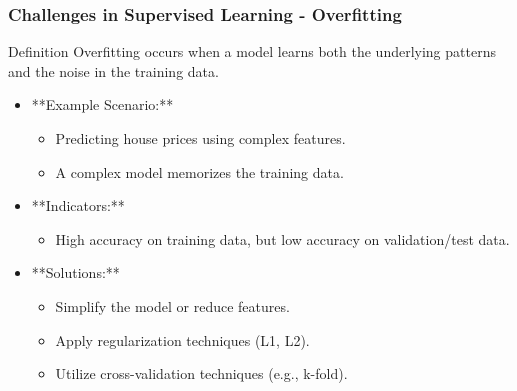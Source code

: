 \documentclass[aspectratio=169]{beamer}
\begin{document}
\begin{frame}[fragile]
    \frametitle{Challenges in Supervised Learning - Overfitting}
    \begin{block}{Definition}
        Overfitting occurs when a model learns both the underlying patterns and the noise in the training data.
    \end{block}
    \begin{itemize}
        \item **Example Scenario:** 
            \begin{itemize}
                \item Predicting house prices using complex features.
                \item A complex model memorizes the training data.
            \end{itemize}
        \item **Indicators:** 
            \begin{itemize}
                \item High accuracy on training data, but low accuracy on validation/test data.
            \end{itemize}
        \item **Solutions:**
            \begin{itemize}
                \item Simplify the model or reduce features.
                \item Apply regularization techniques (L1, L2).
                \item Utilize cross-validation techniques (e.g., k-fold).
            \end{itemize}
    \end{itemize}
\end{frame}
\end{document}
